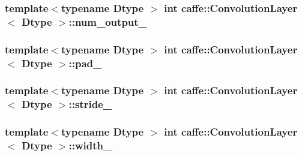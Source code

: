 \hypertarget{classcaffe_1_1_convolution_layer_af58ade65cda5954b9467f82df8999b89}{
\subsubsection[{num\+\_\+output\+\_\+}]{\setlength{\rightskip}{0pt plus 5cm}template$<$typename Dtype $>$ int {\bf caffe\+::\+Convolution\+Layer}$<$ Dtype $>$\+::num\+\_\+output\+\_\+\hspace{0.3cm}{\ttfamily [protected]}}}\label{classcaffe_1_1_convolution_layer_af58ade65cda5954b9467f82df8999b89}
\hypertarget{classcaffe_1_1_convolution_layer_aba61b8e2065eda304e35fa3fa753eb80}{
\subsubsection[{pad\+\_\+}]{\setlength{\rightskip}{0pt plus 5cm}template$<$typename Dtype $>$ int {\bf caffe\+::\+Convolution\+Layer}$<$ Dtype $>$\+::pad\+\_\+\hspace{0.3cm}{\ttfamily [protected]}}}\label{classcaffe_1_1_convolution_layer_aba61b8e2065eda304e35fa3fa753eb80}
\hypertarget{classcaffe_1_1_convolution_layer_a3ba44963cfa4f1bbcdf141d0199bc493}{
\subsubsection[{stride\+\_\+}]{\setlength{\rightskip}{0pt plus 5cm}template$<$typename Dtype $>$ int {\bf caffe\+::\+Convolution\+Layer}$<$ Dtype $>$\+::stride\+\_\+\hspace{0.3cm}{\ttfamily [protected]}}}\label{classcaffe_1_1_convolution_layer_a3ba44963cfa4f1bbcdf141d0199bc493}
\hypertarget{classcaffe_1_1_convolution_layer_a8286a1369f876ad29cea7f3dcca4a3a7}{
\subsubsection[{width\+\_\+}]{\setlength{\rightskip}{0pt plus 5cm}template$<$typename Dtype $>$ int {\bf caffe\+::\+Convolution\+Layer}$<$ Dtype $>$\+::width\+\_\+\hspace{0.3cm}{\ttfamily [protected]}}}\label{classcaffe_1_1_convolution_layer_a8286a1369f876ad29cea7f3dcca4a3a7}


